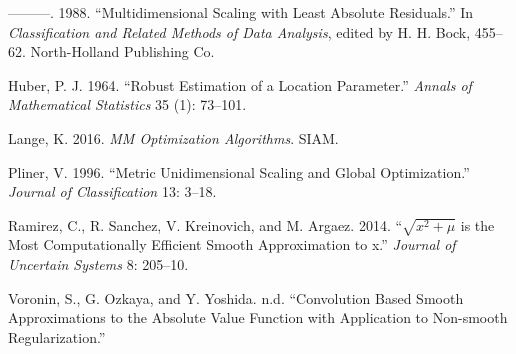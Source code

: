 \documentclass[
  12pt,
  letterpaper,
  DIV=11,
  numbers=noendperiod]{scrartcl}
\newlength{\cslhangindent}
\newenvironment{CSLReferences}[2] %
 {\begin{list}{}{%
  \setlength{\itemindent}{0pt}
  \setlength{\leftmargin}{0pt}
  \setlength{\parsep}{0pt}
  \ifodd #1
   \setlength{\leftmargin}{\cslhangindent}
   \setlength{\itemindent}{-1\cslhangindent}
  \fi
  \setlength{\itemsep}{#2\baselineskip}}}
 {\end{list}}
\begin{document}
\begin{CSLReferences}{1}{0}
---------. 1988. {``{Multidimensional Scaling with Least Absolute
Residuals}.''} In \emph{Classification and Related Methods of Data
Analysis}, edited by H. H. Bock, 455--62. North-Holland Publishing Co.

Huber, P. J. 1964. {``Robust Estimation of a Location Parameter.''}
\emph{Annals of Mathematical Statistics} 35 (1): 73--101.

Lange, K. 2016. \emph{MM Optimization Algorithms}. SIAM.

Pliner, V. 1996. {``{Metric Unidimensional Scaling and Global
Optimization}.''} \emph{Journal of Classification} 13: 3--18.

Ramirez, C., R. Sanchez, V. Kreinovich, and M. Argaez. 2014.
{``{\(\sqrt{x^2+\mu}\) is the Most Computationally Efficient Smooth
Approximation to \vert{}x\vert{}}.''} \emph{Journal of Uncertain
Systems} 8: 205--10.

Voronin, S., G. Ozkaya, and Y. Yoshida. n.d. {``{Convolution Based
Smooth Approximations to the Absolute Value Function with Application to
Non-smooth Regularization}.''}

\end{CSLReferences}
\end{document}
